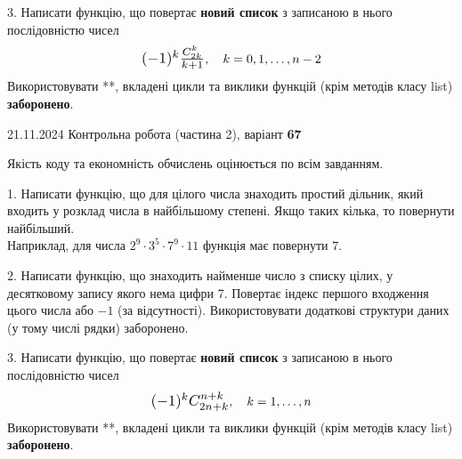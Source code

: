 \documentclass[12pt, ukrainian]{article}
\begin{document}
{{{{{{{\begin {large}
\vspace{10mm}


3. 
Написати функцію, що повертає \textbf{новий список} з записаною в нього послідовністю чисел
$$\scalebox{1.2}{$(-1)^{k}\frac{C_{2k}^k}{k+1}$}, \quad k=0,1,\ldots,n-2$$
Використовувати **, вкладені цикли та виклики функцій (крім методів класу list) \textbf{заборонено}.

\end{large}
\vspace{25mm}


{{21.11.2024 Контрольна робота  (частина 2), варіант  \No \textbf { 67 }\par}}


{
\begin {large}
Якість коду та економність обчислень оцінюється по всім завданням.

\vspace{5mm}

1. Написати функцію, що для цілого числа знаходить простий дільник, який входить у розклад числа в найбільшому степені. Якщо таких кілька, то повернути найбільший. \\ Наприклад, для числа $2^{9}{\cdot}3^5{\cdot}7^9{\cdot}11$ функція має повернути $7$.

\vspace{10mm}


2. Написати функцію, що знаходить найменше число з списку цілих, у десятковому запису якого нема цифри 7. Повертає індекс першого входження цього числа або $-1$ (за відсутності). Використовувати додаткові структури даних (у тому числі рядки) заборонено.

\vspace{10mm}


3. 
Написати функцію, що повертає \textbf{новий список} з записаною в нього послідовністю чисел
$$\scalebox{1.2}{$(-1)^{k}C_{2n+k}^{n+k}$}, \quad k=1,\ldots,n$$
Використовувати **, вкладені цикли та виклики функцій (крім методів класу list) \textbf{заборонено}.


\end{large}}}}}}}}}
\end{document}
